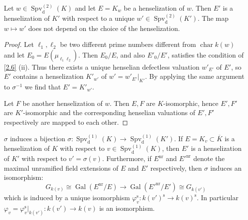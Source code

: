 \begin{lemma}\label{3.1}
Let $w\in\operatorname{Spv}_\text{d}^{(2)}(K)$ and let $E=K_w$ be a henselization of $w$. Then $E'$ is a henselization of $K'$ with respect to a unique $w'\in\operatorname{Spv}_\text{d}^{(2)}(K')$. The map $w\mapsto w'$ does not depend on the choice of the henselization.
\end{lemma}

\begin{proof}
Let $\ell_1,\ell_2$ be two different prime numbers different from $\operatorname{char} k(w)$ and let $E_0 = E(\mu_{\ell_1\ell_2})$. Then $E_0/E$, and also $E'_0/E'$, satisfies the condition of \ref{2.6} (ii). Thus there exists a unique henselian defectless valuation $w'_{E'}$ of $E'$, so $E'$ contains a henselization $K'_{w'}$ of $w' = w'_{E'}|_{K'}$. By applying the same argument to $\sigma^{-1}$ we find that $E' = K'_{w'}$.

Let $F$ be another henselization of $w$. Then $E, F$ are $K$-isomorphic, hence $E',F'$ are $K'$-isomorphic and the corresponding henselian valuations of $E', F'$ respectively are mapped to each other.
\end{proof}

\begin{lemma}\label{3.2}
$\sigma$ induces a bijection $\sigma:\operatorname{Spv}_\text{d}^{(1)}(K) \to\operatorname{Spv}_\text{d}^{(1)}(K')$. If $E=K_v\subset\overline{K}$ is a henselization of $K$ with respect to $v\in\operatorname{Spv}_\text{d}^{(1)}(K)$, then $E'$ is a henselization of $K'$ with respect to $v'=\sigma(v)$. Furthermore, if $E^{\text{nr}}$ and $E'^{\text{nr}}$ denote the maximal unramified field extensions of $E$ and $E'$ respectively, then $\sigma$ induces an isomorphism:
\[ G_{k(v)}\cong\operatorname{Gal}(E^\text{nr}/E) \to\operatorname{Gal}(E'^{\text{nr}}/E')\cong G_{k(v')} \]
which is induced by a unique isomorphism $\varphi_v^\text{s}:k(v')^\text{s}\to k(v)^\text{s}$. In particular $\varphi_v=\varphi_v^\text{s}|_{k(v')}:k(v')\to k(v)$ is an isomorphism.
\end{lemma}

